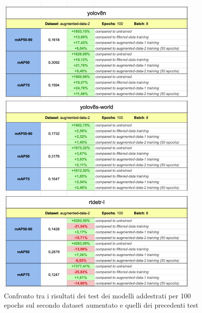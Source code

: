 \begin{figure}[ht]
    \centering
    \includegraphics[width=0.9\textwidth]{files/capitoli/4-sperimentazione-risultati/assets/augmented-data-2(100)-compare.png}
    \caption{\label{fig:augmented-data-2(100)-compare}Confronto tra i risultati dei test dei modelli addestrati per 100 epochs sul secondo dataset aumentato e quelli dei precedenti test}
\end{figure}

\clearpage

